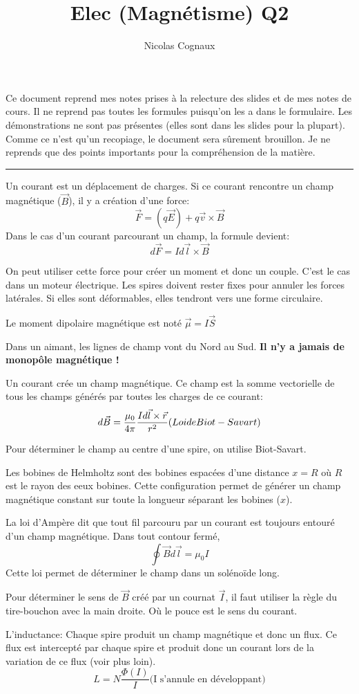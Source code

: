 \documentclass[11pt,a4paper]{article} %
\title{Elec (Magnétisme) Q2}
\author{Nicolas Cognaux}
\begin{document}
\maketitle
Ce document reprend mes notes prises à la relecture des slides et de mes notes de cours. Il ne reprend pas toutes les formules puisqu'on les a dans le formulaire. Les démonstrations ne sont pas présentes (elles sont dans les slides pour la plupart). 
Comme ce n'est qu'un recopiage, le document sera sûrement brouillon. Je ne reprends que des points importants pour la compréhension de la matière.

\rule{\linewidth}{.5pt}


Un courant est un déplacement de charges. Si ce courant rencontre un champ magnétique ($\vec B$), il y a création d'une force:
$$ \vec F = (q \vec E) + q \vec v \times \vec B $$
Dans le cas d'un courant parcourant un champ, la formule devient:
$$ d\vec F = Id\vec l \times \vec B $$

On peut utiliser cette force pour créer un moment et donc un couple. C'est le cas dans un moteur électrique. Les spires doivent rester fixes pour annuler les forces latérales. Si elles sont déformables, elles tendront vers une forme circulaire.

Le moment dipolaire magnétique est noté $\vec \mu = I \vec S$

Dans un aimant, les lignes de champ vont du Nord au Sud. { \bf Il n'y a jamais de monopôle magnétique !}

Un courant crée un champ magnétique. Ce champ est la somme vectorielle de tous les champs générés par toutes les charges de ce courant:
$$ d\vec B = \frac{\mu_0}{4\pi}\frac{Id\vec l\times \vec r}{r^2} \textrm(Loi de Biot-Savart)$$

Pour déterminer le champ au centre d'une spire, on utilise Biot-Savart.

Les bobines de Helmholtz sont des bobines espacées d'une distance $x = R$ où $R$ est le rayon des eeux bobines. Cette configuration permet de générer un champ magnétique constant sur toute la longueur séparant les bobines ($x$).

La loi d'Ampère dit que tout fil parcouru par un courant est toujours entouré d'un champ magnétique. Dans tout contour fermé,
$$\oint \vec B d\vec l = \mu_0 I$$
Cette loi permet de déterminer le champ dans un solénoïde long.

Pour déterminer le sens de $\vec B$ créé par un cournat $\vec I$, il faut utiliser la règle du tire-bouchon avec la main droite. Où le pouce est le sens du courant.

L'inductance: Chaque spire produit un champ magnétique et donc un flux. Ce flux est intercepté par chaque spire et produit donc un courant lors de la variation de ce flux (voir plus loin).
$$L = N\frac{\Phi(I)}{I} \textrm{(I s'annule en développant)}$$ 
\end{document}
